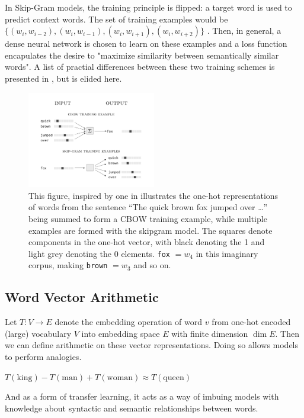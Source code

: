 \documentclass[11pt,a4paper]{article}
\begin{document}
In Skip-Gram models, the training principle is flipped: a target word is used to
predict context words. The set of training examples would be $\{(w_i, w_{i-2}),
  (w_i, w_{i-1}), (w_i, w_{i+1}), (w_i, w_{i+2}) \}$
\citet{mikolov2013exploiting}. Then, in general, a dense neural network is
chosen to learn on these examples and a loss function encapulates the desire to
"maximize similarity between semantically similar words". A list of practial
differences between these two training schemes is presented in
\citet{mikolov2013exploiting}, but is elided here.

\begin{figure}
  \includegraphics[width=0.5\textwidth]{figures/cbow-skipgram-train.pdf}
  \caption{This figure, inspired by one in  \citet{mikolov2013exploiting}
    illustrates the one-hot representations of words from the sentence ``The quick
    brown fox jumped over \dots'' being summed to form a CBOW training example,
    while multiple examples are formed with the skipgram model. The squares denote
    components in the one-hot vector, with black denoting the 1 and light grey
    denoting the 0 elements. \texttt{fox} $=w_4$ in this imaginary corpus, making
    \texttt{brown} $ = w_3$ and so on.}
\end{figure}



\subsection{Word Vector Arithmetic}

Let $T : V \to E$ denote the embedding operation of word $v$ from one-hot
encoded (large) vocabulary $V$ into embedding space $E$ with finite dimension
$\dim E$.  Then we can define arithmetic on these vector representations. Doing
so allows models to perform analogies.

$T(\text{king}) - T(\mathrm{man}) + T(\mathrm{woman})  \approx T(\mathrm{queen})$

And as a form of transfer learning, it acts as a way of imbuing models with
knowledge about syntactic and semantic relationships between words.
\end{document}
